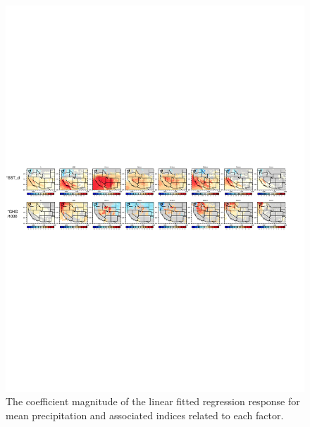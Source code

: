 \documentclass{ametsoc}
\begin{document}
\begin{figure}
\begin{center}
\includegraphics[width=6in]{wd_lmfit_coef_enso_ghg.pdf}
\caption{The coefficient magnitude of the linear fitted regression response for mean precipitation and associated indices related to each factor.}
\end{center}
\label{fig:S9}
\end{figure}
\end{document}
